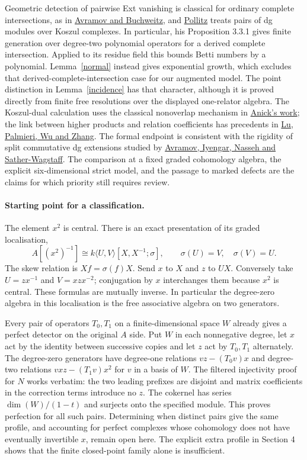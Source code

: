 \documentclass[11pt]{article}
\begin{document}
Geometric detection of pairwise Ext vanishing is classical for ordinary
complete intersections, as in \href{https://doi.org/10.1007/s002220000090}{Avramov and Buchweitz}, and
\href{https://arxiv.org/abs/1912.12009}{Pollitz} treats pairs of dg modules
over Koszul complexes. In particular, his Proposition 3.3.1 gives finite
generation over degree-two polynomial operators for a derived complete
intersection. Applied to its residue field this bounds Betti numbers by
a polynomial. Lemma~\ref{normal} instead gives exponential growth, which
excludes that derived-complete-intersection case for our augmented model.
The point distinction in Lemma~\ref{incidence}
has that character, although it is proved directly from finite free
resolutions over the displayed one-relator algebra. The Koszul-dual
calculation uses the classical nonoverlap mechanism in
\href{https://doi.org/10.1016/0021-8693(82)90104-1}{Anick's work};
the link between higher products and relation coefficients has precedents
in \href{https://arxiv.org/abs/math/0606144}{Lu, Palmieri, Wu and Zhang}.
The formal endpoint is consistent with the rigidity of split
commutative dg extensions studied by
\href{https://arxiv.org/abs/1508.00748}{Avramov, Iyengar, Nasseh and
Sather-Wagstaff}. The comparison at a fixed graded cohomology algebra,
the explicit six-dimensional strict model, and the passage to marked
defects are the claims for which priority still requires review.

\paragraph{Starting point for a classification.}
The element $x^2$ is central. There is an exact presentation of its
graded localisation,
\[
 A[(x^2)^{-1}]\cong k\langle U,V\rangle[X,X^{-1};\sigma],
 \qquad \sigma(U)=V,\quad\sigma(V)=U .
\]
The skew relation is $Xf=\sigma(f)X$. Send $x$ to $X$ and $z$ to
$UX$. Conversely take $U=zx^{-1}$ and $V=xzx^{-2}$; conjugation by
$x$ interchanges them because $x^2$ is central. These formulas are
mutually inverse. In particular the degree-zero algebra in this
localisation is the free associative algebra on two generators.

Every pair of operators $T_0,T_1$ on a finite-dimensional space $W$
already gives a perfect detector on the original $A$ side. Put $W$ in
each nonnegative degree, let $x$ act by the identity between successive
copies and let $z$ act by $T_0,T_1$ alternately. The degree-zero
generators have degree-one relations $v z-(T_0v)x$ and degree-two
relations $v xz-(T_1v)x^2$ for $v$ in a basis of $W$. The filtered
injectivity proof for $N$ works verbatim: the two leading prefixes are
disjoint and matrix coefficients in the correction terms introduce no
$z$. The cokernel has series $\dim(W)/(1-t)$ and surjects onto the
specified module. This proves perfection for all such pairs.
Determining when distinct pairs give the same profile, and accounting
for perfect complexes whose cohomology does not have eventually
invertible $x$, remain open here. The explicit extra profile in Section 4
shows that the finite closed-point family alone is insufficient.
\end{document}
